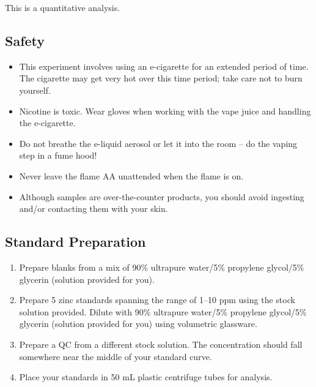 \documentclass[]{tufte-book}
\providecommand{\tightlist}{%
  \setlength{\itemsep}{0pt}\setlength{\parskip}{0pt}}
\begin{document}
This is a quantitative analysis.

\hypertarget{safety-2}{%
\subsection*{Safety}\label{safety-2}}

\begin{itemize}
\tightlist
\item
  This experiment involves using an e-cigarette for an extended period of time. The cigarette may get very hot over this time period; take care not to burn yourself.\\
\item
  Nicotine is toxic. Wear gloves when working with the vape juice and handling the e-cigarette.\\
\item
  Do not breathe the e-liquid aerosol or let it into the room -- do the vaping step in a fume hood!\\
\item
  Never leave the flame AA unattended when the flame is on.\\
\item
  Although samples are over-the-counter products, you should avoid ingesting and/or contacting them with your skin.
\end{itemize}

\hypertarget{standard-preparation}{%
\subsection{Standard Preparation}\label{standard-preparation}}

\begin{enumerate}
\def\labelenumi{\arabic{enumi}.}
\tightlist
\item
  Prepare blanks from a mix of 90\% ultrapure water/5\% propylene glycol/5\% glycerin (solution provided for you).
\item
  Prepare 5 zinc standards spanning the range of 1--10 ppm using the stock solution provided. Dilute with 90\% ultrapure water/5\% propylene glycol/5\% glycerin (solution provided for you) using volumetric glassware.
\item
  Prepare a QC from a different stock solution. The concentration should fall somewhere near the middle of your standard curve.
\item
  Place your standards in 50 mL plastic centrifuge tubes for analysis.
\end{enumerate}
\end{document}
